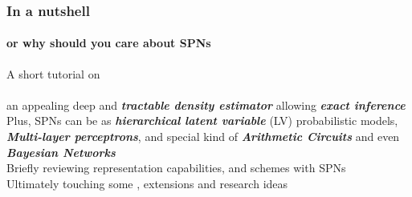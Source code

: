 \documentclass[xcolor={usenames,dvipsnames,svgnames}, compress, aspectratio=169, 11pt]{beamer}
\begin{document}
{
  \begin{frame}
    \titlepage
  \end{frame}
}




\begin{frame}[t, htt=gold2]
  \frametitle{In a nutshell}
  \framesubtitle{or why should you care about SPNs}
  \small

  A short tutorial on\\[5pt]
  \hspace{105pt}~\emph{\parencite{Poon2011}}\\[5pt]

  an appealing deep and
          {\emph{\textbf{tractable density estimator}}} allowing {\emph{\textbf{exact inference}}}
          \\[20pt]

  Plus, SPNs can be  as {\emph{\textbf{hierarchical latent
      variable}}} (LV)
  probabilistic models,
  {\emph{\textbf{Multi-layer
        perceptrons}}}, and special kind of {\emph{\textbf{Arithmetic
  Circuits}}} and even \emph{\textbf{Bayesian Networks}}\\[20pt]
  
 Briefly reviewing representation capabilities,
  and  schemes with
  SPNs\\[20pt]

  Ultimately touching some , extensions and research ideas\\[20pt]

  
\end{frame}
\end{document}
